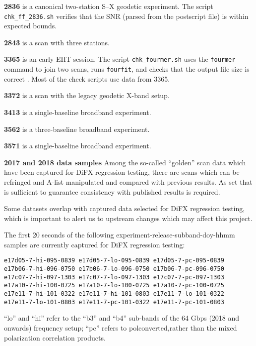 \begin{description}
\item{\textbf{2836}} is a canonical two-station S--X geodetic experiment. The script \texttt{chk\_ff\_2836.sh} verifies that the SNR (parsed from the postscript file) is within expected bounds.
\item{\textbf{2843}} is a scan with three stations.
\item{\textbf{3365}} is an early \ac{EHT} session. The script \texttt{chk\_fourmer.sh} uses the \texttt{fourmer} command to join two scans, runs \texttt{fourfit}, and checks that the output file size is correct . Most of the check scripts use data from 3365.
\item{\textbf{3372}} is a scan with the legacy geodetic X-band setup.
\item{\textbf{3413}} is a single-baseline broadband experiment.
\item{\textbf{3562}} is a three-baseline broadband experiment.
\item{\textbf{3571}} is a single-baseline broadband experiment.
\item{\textbf{2017 and 2018 data samples}} Among the so-called ``golden'' scan data which have been captured for \acs{DiFX} regression testing, there are scans which can be refringed and \acs{A-list} manipulated and compared with previous results.  As set that is sufficient to guarantee consistency with published results is required. 
\end{description}
Some datasets overlap with captured data selected for DiFX regression testing, which is important to alert us to upstream changes which may affect this project.

The first 20 seconds of the following experiment-release-subband-doy-hhmm samples are currently captured for \acs{DiFX} regression testing:
\begin{verbatim}
e17d05-7-hi-095-0839 e17d05-7-lo-095-0839 e17d05-7-pc-095-0839
e17b06-7-hi-096-0750 e17b06-7-lo-096-0750 e17b06-7-pc-096-0750
e17c07-7-hi-097-1303 e17c07-7-lo-097-1303 e17c07-7-pc-097-1303
e17a10-7-hi-100-0725 e17a10-7-lo-100-0725 e17a10-7-pc-100-0725
e17e11-7-hi-101-0322 e17e11-7-hi-101-0803 e17e11-7-lo-101-0322
e17e11-7-lo-101-0803 e17e11-7-pc-101-0322 e17e11-7-pc-101-0803
\end{verbatim}
``lo'' and ``hi'' refer to the ``b3'' and ``b4'' sub-bands of the 64 \acs{Gbps} (2018 and onwards) frequency setup; ``pc'' refers to polconverted,rather than the mixed polarization correlation products.


